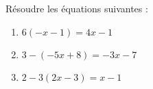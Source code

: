 \documentclass[a4paper,11pt,exos]{nsi} %
\begin{document}
\maketitle




\begin{exercice}
Résoudre les équations suivantes :
\begin{multicols}{3}
	\begin{enumerate}
		\item $6(-x-1)=4x-1$
        \item $3-(-5x+8)=-3x-7$
		\item $2-3(2x-3)=x-1$
	\end{enumerate}
\end{multicols}

\end{exercice}
\end{document}
